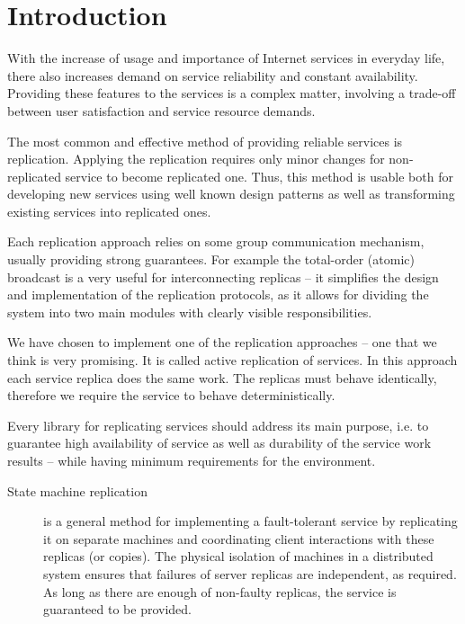 
\chapter{Introduction}

With the increase of usage and importance of Internet services in everyday life, there also increases demand on service reliability and constant availability.
Providing these features to the services is a complex matter, involving a trade-off between user satisfaction and service resource demands.

The most common and effective method of providing reliable services is replication. Applying the replication requires only minor changes for non-replicated service to become replicated one. Thus, this method is usable both for developing new services using well known design patterns as well as transforming existing services into replicated ones.

Each replication approach relies on some group communication mechanism, usually providing strong guarantees. For example the total-order (atomic) broadcast is a very useful for interconnecting replicas -- it simplifies the design and implementation of the replication protocols, as it allows for dividing the system into two main modules with clearly visible responsibilities.

We have chosen to implement one of the replication approaches -- one that we think is very promising.
It is called active replication of services. In this approach each service replica does the same work. The replicas must behave identically, therefore we require the service to behave deterministically.

Every library for replicating services should address its main purpose, i.e. to guarantee high availability of service as well as durability of the service work results
 -- while having minimum requirements for the environment. %

\begin{description}
  \item[State machine replication] is a general method for implementing a fault-tolerant service by replicating it on separate machines and coordinating client interactions with these replicas (or copies). The physical isolation of machines in a distributed system ensures that failures of server replicas are independent, as required. As long as there are enough of non-faulty replicas, the service is guaranteed to be provided.
\end{description}


